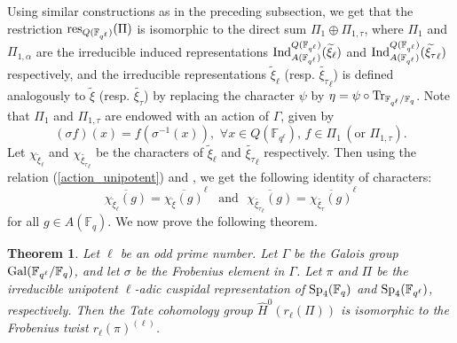 \documentclass[10pt, reqno]{amsart}
\theoremstyle{plain}
\numberwithin{equation}{section} \newcommand{\di}{\operatorname{dim}}
\newtheorem{theorem}{Theorem}[subsection]
\begin{document}
\subsubsection{}
Using similar constructions as in the preceding subsection, we get
that the restriction ${\rm res}_{Q(\mathbb{F}_{q^\ell})}(\Pi)$ is
isomorphic to the direct sum $\Pi_1\oplus \Pi_{1,\tau}$, where $\Pi_1$
and $\Pi_{1,\alpha}$ are the irreducible induced representations
${\rm Ind}_{A(\mathbb{F}_{q^\ell})}^
{Q(\mathbb{F}_{q^\ell})}
(\widetilde{\xi}_\ell)$ and
${\rm Ind}_{A(\mathbb{F}_{q^\ell})}^
{Q(\mathbb{F}_{q^\ell})}
(\widetilde{\xi_\tau}_\ell)$ respectively, 
and the irreducible
representations $\widetilde{\xi}_\ell$
(resp. $\widetilde{\xi_\tau}_\ell$) is defined analogously to
$\widetilde{\xi}$ (resp. 
$\widetilde{\xi_\tau}$) by replacing the
character $\psi$ by
$\eta=\psi\circ{\rm Tr}_{\mathbb{F}_{q^\ell}/\mathbb{F}_q}$.  Note
that $\Pi_1$ and $\Pi_{1,\tau}$ are endowed with an action of
$\Gamma$, given by
$$ (\sigma f)(x) = f(\sigma^{-1}(x)),\,\,
\forall x\in Q(\mathbb{F}_{q^\ell}),\, f\in \Pi_1\,(\text{or}\,\,\Pi_{1,\tau}). $$
Let $\chi_{\widetilde{\xi}_\ell}$ and
$\chi_{\widetilde{\xi_\tau}_\ell}$ be the characters of
$\widetilde{\xi}_\ell$ and $\widetilde{\xi_\tau}_\ell$ respectively.
Then using the relation (\ref{action_unipotent}) and \cite[Equations
$(1)$ and $(2)$]{Golfand_Sp4}, we get the following identity of
characters:
\begin{equation}\label{char_symp}
\overline{\chi_{\widetilde{\xi}_\ell}(g)} 
= \overline{\chi_{\widetilde{\xi}}(g)}^\ell
\,\,\,\,\,\text{and}\,\,\,\,
\overline{\chi_{\widetilde{\xi_\tau}_\ell}(g)} 
= \overline{\chi_{\widetilde{\xi_\tau}}(g)}^\ell
\end{equation}
for all $g\in A(\mathbb{F}_q)$. We now prove the following theorem.
\begin{theorem}
  Let $\ell$ be an odd prime number.  Let $\Gamma$ be the Galois group
  ${\rm Gal}(\mathbb{F}_{q^\ell}/\mathbb{F}_q)$, and let $\sigma$ be
  the Frobenius element in $\Gamma$. Let $\pi$ and $\Pi$ be the
  irreducible unipotent $\ell$-adic cuspidal representation of
  ${\rm Sp}_4(\mathbb{F}_q)$ and ${\rm Sp}_4(\mathbb{F}_{q^\ell})$,
  respectively.  Then the Tate cohomology group
  $\widehat{H}^0(r_\ell(\Pi))$ is isomorphic to the Frobenius twist
  $r_\ell(\pi)^{(\ell)}$.
\end{theorem}
\end{document}
